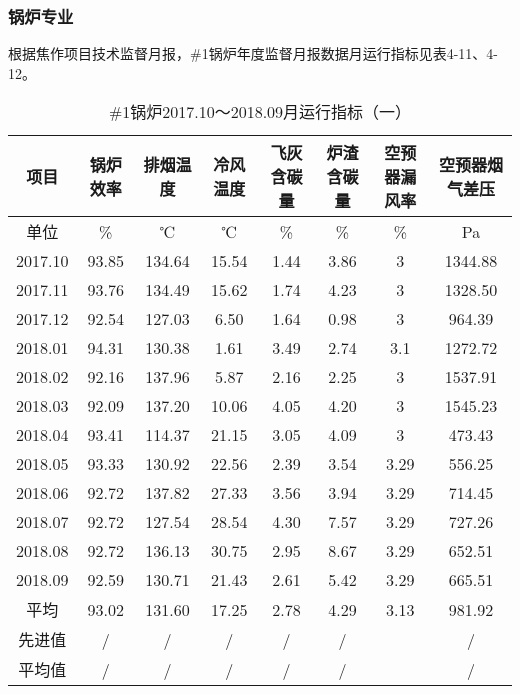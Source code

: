 \documentclass[a4paper, 11pt]{article}
\begin{document}
\subsubsection{锅炉专业}
根据焦作项目技术监督月报，\#1锅炉{{年度监督月报数据}}月运行指标见表4-11、4-12。
\begin{table}[H]
\centering
\caption{\#1锅炉2017.10～2018.09月运行指标（一）}  %
\label{锅炉2017.10～2018.09月运行指标（一）}
\begin {tabular}{|c|c|c|c|c|c|c|c|}
\hline
项目&锅炉效率&排烟温度&冷风温度&飞灰含碳量&炉渣含碳量&空预器漏风率&空预器烟气差压\\
\hline
单位&\%&℃&℃&\%&\%&\%&Pa\\
\hline
2017.10&93.85&134.64&15.54&1.44&3.86&3&1344.88\\
\hline
2017.11&93.76&134.49&15.62&1.74&4.23&3&1328.50\\
\hline
2017.12&92.54&127.03&6.50&1.64&0.98&3&964.39\\
\hline
2018.01&94.31&130.38&1.61&3.49&2.74&3.1&1272.72\\
\hline
2018.02&92.16&137.96&5.87&2.16&2.25&3&1537.91\\
\hline
2018.03&92.09&137.20&10.06&4.05&4.20&3&1545.23\\
\hline
2018.04&93.41&114.37&21.15&3.05&4.09&3&473.43\\
\hline
2018.05&93.33&130.92&22.56&2.39&3.54&3.29&556.25\\
\hline
2018.06&92.72&137.82&27.33&3.56&3.94&3.29&714.45\\
\hline
2018.07&92.72&127.54&28.54&4.30&7.57&3.29&727.26\\
\hline
2018.08&92.72&136.13&30.75&2.95&8.67&3.29&652.51\\
\hline
2018.09&92.59&130.71&21.43&2.61&5.42&3.29&665.51\\
\hline
平均&93.02&131.60&17.25&2.78&4.29&3.13&981.92\\
\hline
先进值&/&/&/&/&/&&/\\
\hline
平均值&/&/&/&/&/&&/\\
\hline
\end{tabular}
\end{table}
\end{document}
